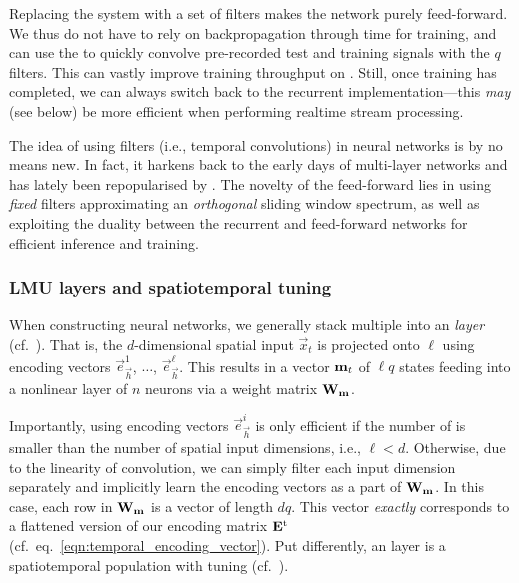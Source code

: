 Replacing the \LTI system with a set of \FIR filters makes the network purely feed-forward.
We thus do not have to rely on backpropagation through time \citep[e.g.,][]{werbos1990backpropagation} for training, and can use the \FFT to quickly convolve pre-recorded test and training signals with the $q$ \FIR filters.
This can vastly improve training throughput on \GPUpl \citep{chilkuri2021parallelizing}.
Still, once training has completed, we can always switch back to the recurrent implementation---this \emph{may} (see below) be more efficient when performing realtime stream processing.

The idea of using \FIR filters (i.e., temporal convolutions) in neural networks is by no means new.
In fact, it harkens back to the early days of multi-layer networks \citep[e.g.,][]{waibel1989phoneme,back1991fir} and has lately been repopularised by \citet{bai2018empirical}.
The novelty of the feed-forward \LMU lies in using \emph{fixed} \FIR filters approximating an \emph{orthogonal} sliding window spectrum, as well as exploiting the duality between the recurrent and feed-forward networks for efficient inference and training.

\subsubsection{LMU layers and spatiotemporal tuning}
When constructing neural networks, we generally stack multiple \LMUpl into an \emph{\LMU layer} (cf.~).
That is, the $d$-dimensional spatial input $\vec x_t$ is projected onto $\ell$ \LMUpl using encoding vectors $\vec e^1_{\vec h}$, $\ldots$, $\vec e^\ell_{\vec h}$.
This results in a vector $\mathbf{m}_t$ of $\ell q$ states feeding into a nonlinear layer of $n$ neurons via a weight matrix $\mathbf{W}_{\mathbf{m}}$.

Importantly, using encoding vectors $\vec e^i_{\vec h}$ is only efficient if the number of \LMUpl is smaller than the number of spatial input dimensions, i.e., $\ell < d$.
Otherwise, due to the linearity of convolution, we can simply filter each input dimension separately and implicitly learn the encoding vectors as a part of $\mathbf{W}_{\mathbf{m}}$.
In this case, each row in $\mathbf{W}_{\mathbf{m}}$ is a vector of length $d q$.
This vector \emph{exactly} corresponds to a flattened version of our encoding matrix $\mathbf{E}^\mathrm{t}$ (cf.~eq.~\ref{eqn:temporal_encoding_vector}).
Put differently, an \LMU layer is a spatiotemporal \NEF population with \LDN tuning (cf.~).

